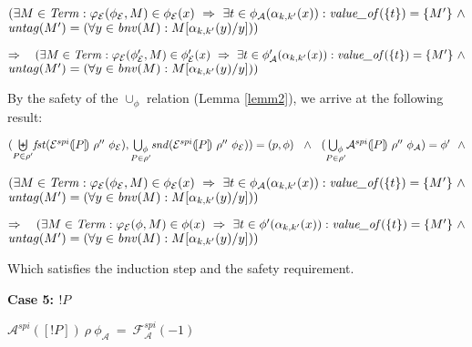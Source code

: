 \documentclass[10pt,a4paper,final,oneside,fleqn]{book}
\begin{document}
\noindent
$(\exists M\in\mbox{{\itshape Term\/}}:\varphi_\mathcal{E}(\phi_\mathcal{E},M)\in\phi_\mathcal{E}(x)~\Rightarrow~\exists t\in\phi_\mathcal{A}(\alpha_{k,k'}(x)):\mbox{{\itshape value\_of\/}}(\{t\})=\{M'\}~\wedge$\\
$\mbox{{\itshape untag\/}}(M')=(\forall y\in\mbox{{\itshape bnv\/}}(M):M[\alpha_{k,k'}(y)/y]))$\vspace{5mm}

\noindent
$\Rightarrow~~~(\exists M\in\mbox{{\itshape Term\/}}:\varphi_\mathcal{E}(\phi'_\mathcal{E},M)\in\phi'_\mathcal{E}(x)~\Rightarrow~\exists t\in\phi'_\mathcal{A}(\alpha_{k,k'}(x)): \mbox{{\itshape value\_of\/}}(\{t\})=\{M'\}~\wedge$\\
$\mbox{{\itshape untag\/}}(M')=(\forall y\in\mbox{{\itshape bnv\/}}(M):M[\alpha_{k,k'}(y)/y]))$\vspace{5mm}

\noindent
By the safety of the $\cup_\phi$ relation (Lemma \ref{lemm2}), we arrive at the following result:

\noindent
$(\underset{P\in\rho'}{\biguplus}\mbox{{\itshape fst\/}}(\mathcal{E}^{spi}(\![P]\!)~\rho''~\phi_{\mathcal{E}}),\underset{P\in\rho'}{\bigcup_\phi}\mbox{{\itshape snd\/}}(\mathcal{E}^{spi}(\![P]\!)~\rho''~\phi_{\mathcal{E}}))=(p,\phi)~~\wedge~~(\underset{P\in\rho'}{\bigcup_\phi}\mathcal{A}^{spi}(\![P]\!)~\rho''~\phi_{\mathcal{A}})=\phi'~~\wedge$

\noindent
$(\exists M\in\mbox{{\itshape Term\/}}:\varphi_\mathcal{E}(\phi_\mathcal{E},M)\in\phi_\mathcal{E}(x)~\Rightarrow~\exists t\in\phi_\mathcal{A}(\alpha_{k,k'}(x)):\mbox{{\itshape value\_of\/}}(\{t\})=\{M'\}~\wedge$\\
$\mbox{{\itshape untag\/}}(M')=(\forall y\in\mbox{{\itshape bnv\/}}(M):M[\alpha_{k,k'}(y)/y]))$\vspace{5mm}

\noindent
$\Rightarrow~~~(\exists M\in\mbox{{\itshape Term\/}}:\varphi_\mathcal{E}(\phi,M)\in\phi(x)~\Rightarrow~\exists t\in\phi'(\alpha_{k,k'}(x)): \mbox{{\itshape value\_of\/}}(\{t\})=\{M'\}~\wedge$\\
$\mbox{{\itshape untag\/}}(M')=(\forall y\in\mbox{{\itshape bnv\/}}(M):M[\alpha_{k,k'}(y)/y]))$\vspace{5mm}

\noindent
Which satisfies the induction step and the safety requirement.\vspace{5mm}

\noindent
{\bf Case 5: $!P$}

\noindent
$\mathcal{A}^{spi}(\![!P]\!)~\rho~\phi_\mathcal{A}~=~\mathcal{F}^{spi}_{\mathcal{A}}(-1)$
\end{document}
